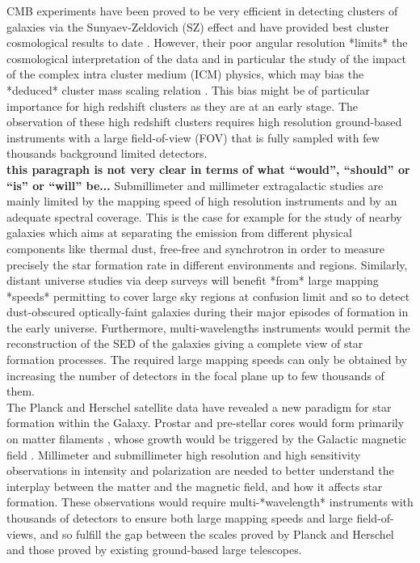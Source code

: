 \documentclass[]{aa} %
\begin{document}
CMB experiments have been proved to be very efficient in detecting clusters of
galaxies via the Sunyaev-Zeldovich (SZ) effect \cite{plancksz,actsz,sptsz} and
have provided best cluster cosmological results to date
\cite{planckpapers}. However, their poor angular resolution *limits* the
cosmological interpretation of the data and in particular the study of the
impact of the complex intra cluster medium (ICM) physics, which may bias the
*deduced* cluster mass scaling relation \cite{planckcosmo}. This bias might
be of particular importance for high redshift clusters as they are at an early
stage. The observation of these high redshift clusters requires high resolution
ground-based instruments with a large field-of-view (FOV) that is fully sampled
with few thousands background limited detectors. \\

{\bf this paragraph is not very clear in terms of what ``would'', ``should'' or
  ``is'' or ``will'' be...}
Submillimeter and millimeter extragalactic studies are mainly limited by the
mapping speed of high resolution instruments and by an adequate spectral
coverage. This is the case for example for the study of nearby galaxies which
aims at separating the emission from different physical components like thermal
dust, free-free and synchrotron in order to measure precisely the star formation
rate in different environments and regions. Similarly, distant universe studies
via deep surveys will benefit *from* large mapping *speeds* permitting to cover
large sky regions at confusion limit and so to detect dust-obscured
optically-faint galaxies during their major episodes of formation in the early
universe. Furthermore, multi-wavelengths instruments would permit the
reconstruction of the SED of the galaxies giving a complete view of star
formation processes. The required large mapping speeds can only be obtained by
increasing the number of detectors in the focal plane up to few thousands of
them. \\

The Planck \cite{} and Herschel \cite{} satellite data have revealed a new
paradigm for star formation within the Galaxy. Prostar and pre-stellar cores
would form primarily on matter filaments \cite{}, whose growth would be
triggered by the Galactic magnetic field \cite{}. Millimeter and submillimeter
high resolution and high sensitivity observations in intensity and polarization
are needed to better understand the interplay between the matter and the
magnetic field, and how it affects star formation. These observations would
require multi-*wavelength* instruments with thousands of detectors to ensure both
large mapping speeds and large field-of-views, and so fulfill the gap between
the scales proved by Planck and Herschel and those proved by existing
ground-based large telescopes.\\
\end{document}

